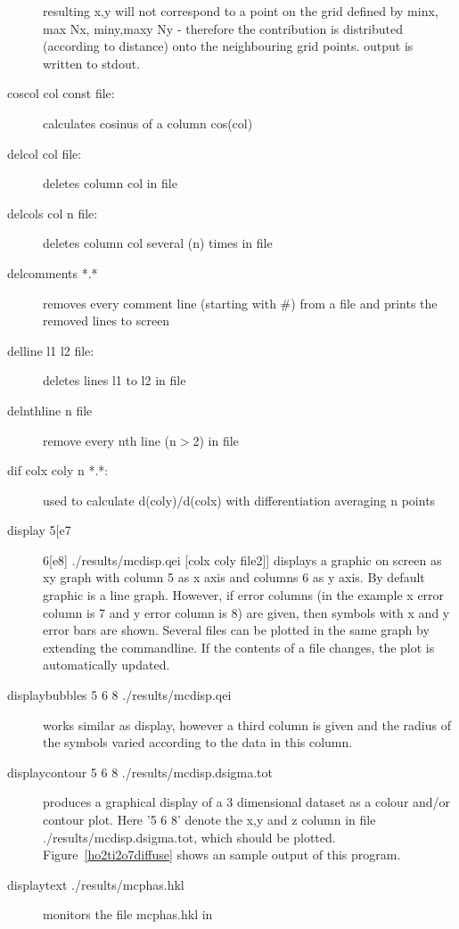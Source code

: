 \begin{description}
                        resulting x,y will not correspond to a point on the grid defined by minx, max Nx, miny,maxy Ny -
                        therefore the contribution is distributed (according to distance) onto the neighbouring grid
                       points.
		       output is written to stdout. 
\item [\prg coscol\index{coscol} col const file:] calculates cosinus of a column cos(col) 
\item [\prg delcol\index{delcol} col file:] deletes column col in file
\item [\prg delcols\index{delcols} col n file:] deletes column col several (n) times in file
\item [\prg delcomments *.*] removes every comment line (starting with \#) from a file and %
prints the removed lines to screen
\item [\prg delline\index{delline} l1 l2 file:] deletes lines l1 to l2  in file
\item [\prg delnthline n file]  remove every nth line (n$>$2) in file
\item [\prg dif\index{dif} colx coly n *.*:] used to calculate d(coly)/d(colx) with %
differentiation averaging n points
\item [\prg display\index{display} 5[e7] 6[e8]  ./results/mcdisp.qei {[colx coly file2]}] displays a graphic on screen as xy %
graph
with column 5 as x axis and columns 6 as y axis. By default graphic is a line graph.
However, if error columns (in the example x error column is 7 and y error column is 8)
are given, then symbols with x and y error bars are shown. Several files
can be plotted in the same graph by extending the commandline. If the contents of a file
changes, the plot is automatically updated.
\item [\prg displaybubbles\index{displaybubbles}  5 6 8 ./results/mcdisp.qei] works similar as %
display, however
a third column is given and the radius of the symbols varied according to the data in 
this column.
\item [\prg displaycontour\index{displaycontour} 5 6 8 ./results/mcdisp.dsigma.tot] produces a %
graphical
display of a 3 dimensional dataset as a colour and/or contour plot. Here '5 6 8' 
denote the x,y and z column in file {\prg ./results/mcdisp.dsigma.tot}, which should
be plotted. Figure~\ref{ho2ti2o7diffuse} shows an sample output of this program.
\item [\prg displaytext\index{displaytext} ./results/mcphas.hkl] monitors the file mcphas.hkl in %

\end{description}
